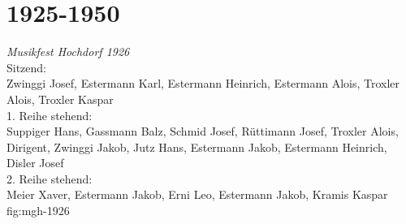 \documentclass[]{book}
\begin{document}
\section{1925-1950}


{\emph{Musikfest Hochdorf 1926}\\
    Sitzend:\\
    Zwinggi Josef, Estermann Karl, Estermann Heinrich, Estermann Alois, Troxler
    Alois, Troxler Kaspar\\
    1. Reihe stehend:\\
    Suppiger Hans, Gassmann Balz, Schmid Josef, Rüttimann Josef, Troxler Alois,
    Dirigent, Zwinggi Jakob, Jutz Hans, Estermann Jakob, Estermann Heinrich,
    Disler Josef\\
    2. Reihe stehend:\\
    Meier Xaver, Estermann Jakob, Erni Leo, Estermann Jakob, Kramis Kaspar}
{fig:mgh-1926}
\end{document}
